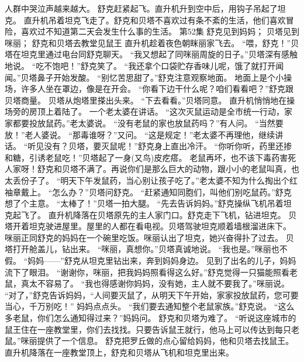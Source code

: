 \documentclass[a4paper,12pt,UTF8,twoside]{ctexbook}
\begin{document}
        人群中哭泣声越来越大。 
        舒克赶紧起飞。直升机升到空中后，用钩子吊起了坦克。 
        直升机吊着坦克飞走了。舒克和贝塔不喜欢过有条不紊的生活，他们喜欢冒险，喜欢过不知道第二天会发生什么事的生活。   第52集 
        舒克见到妈妈； 
        贝塔见到咪丽； 
        舒克和贝塔去教堂见鼠王   
        直升机趁着夜色朝眯丽家飞去。 
        “喂，舒克！”贝塔在坦克里通过电台同舒克聊天。 
        “我又想起了同咪丽周旋的日子。”贝塔深有感触地说。 
        “吃不饱吧！”舒克笑了。 
        “我还拿个口袋贮存香味儿呢，饿了就打开闻闻。”贝塔鼻子开始发酸。 
        “别忆苦思甜了。”舒克注意观察地面。 
        地面上是个小操场，许多人坐在罩边，像是在开会。 
        “你看下边干什么呢？咱们看看吧？”舒克跟贝塔商量。 
        贝塔从炮塔里搽出头来。 
        “下去看看。”贝塔同意。 
        直升机悄悄地在操场旁的房顶上着陆了。 
        一个老太婆在讲话。 
        “这次灭鼠运动是全市统一行动，家家都要投放鼠药。”老太婆说。 
        “没有老鼠的家也放鼠药吗？”有人问。 
        “当然要放！”老人婆说。 
        “那毒谁呀？”又问。 
        “这是规定！”老太婆不再理他，继续讲话。 
        “听见没有？贝塔，要灭鼠呢！”舒克身上直出冷汗。 
        “你听你听，药里还掺和糖，引诱老鼠吃！”贝塔起了一身(又鸟)皮疙瘩。 
        老鼠再坏，也不该下毒药害死人家呀！舒克和贝塔不满了。再说你们是那么巨大的动物，跟小小的老鼠叫真，也太丢份子了。 
        “明天下午发鼠药，当心别让孩子吃了。”老太婆不知为什么掏出个红袖章戴上。 
        “怎么办？”贝塔问舒克。 
        “赶紧通知同胞们，叫他们别吃鼠药。”舒克想了个主意。 
        “太棒了！”贝塔一拍大腿。 
        “先去告诉妈妈。”舒克操纵飞机吊着坦克起飞了。 
        直升机降落在贝塔原先的主人家门口。舒克走下飞机，钻进坦克。 
        贝塔开着坦克驶进屋里。屋里的人都在看电视。贝塔驾驶坦克顺着墙根溜进床下。 
        咪丽正同舒克的妈妈在一个碗里吃饭。咪丽认出了坦克，她兴奋得扑了过去。 
        贝塔打开舱盖儿，钻出来。 
        “咪丽，真想你。”贝塔真诚地说。 
        “我也是。”咪丽也不假。 
        “妈妈——”舒克从坦克里钻出来，奔到妈妈身边。 
        见到了出名的儿子，妈妈流下了眼泪。 
        “谢谢你，咪丽，把我妈妈照看得这么好。”舒克觉得一只猫能照看老鼠，真太不容易了。 
        “我也得感谢你妈妈，没有她，主人就不要我了。”咪丽说。 
        “对了，”舒克告诉妈妈，“人间要灭鼠了，从明天下午开始，家家投放鼠药，您可要当心，千万别吃！” 
        妈妈点点头。 
        “我们要去通知整个老鼠家族。”舒克说。 
        “这么多老鼠，你们怎么通知得过来？”妈妈问。 
        舒克和贝塔为难了。 
        “听说这座城市的鼠王住在一座教堂里，你们去找找。只要告诉鼠王就行，他马上可以传达到每只老鼠。”咪丽提供了一个信息。 
        舒克把罗丘做的点心留给妈妈，他和贝塔去找鼠王。 
        直升机降落在一座教堂顶上，舒克和贝塔从飞机和坦克里出来。 
\end{document}
